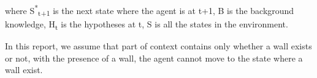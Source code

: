 where S\textsuperscript{*}\textsubscript{t+1} is the next state where the agent is at t+1, 
B is the background knowledge, H\textsubscript{t} is the hypotheses at t, 
S is all the states in the environment.


In this report, we assume that part of context contains only whether a wall exists or not, with the presence of a wall, the agent cannot move to the state where a wall exist.




